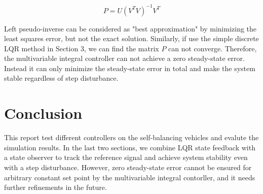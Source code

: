 \documentclass[hyperref]{article}
\theoremstyle{nonumberplain}
\begin{document}
	\begin{equation}
	P=U(V^{T}V)^{-1}V^{T}
	\label{eq49}
	\end{equation}
	
	Left pseudo-inverse can be considered as "best approximation" by minimizing the least squares error, but not the exact solution. Similarly, if use the simple discrete LQR method in Section 3, we can find the matrix $P$ can not converge. Therefore, the multivariable integral controller can not achieve a zero steady-state error. Instead it can only minimize the steady-state error in total and make the system stable regardless of step disturbance.
	
	
	\section{Conclusion}
	
	\hspace{1.0em}
	This report test different controllers on the self-balancing vehicles and evalute the simulation results. In the last two sections, we combine LQR state feedback with a state observer to track the reference signal and achieve system stability even with a step disturbance. However, zero steady-state error cannot be ensured for arbitrary constant set point by the multivariable integral contorller, and it needs further refinements in the future.
	
	
	
	
	
	{}
	
	\newpage
	
\end{document}
